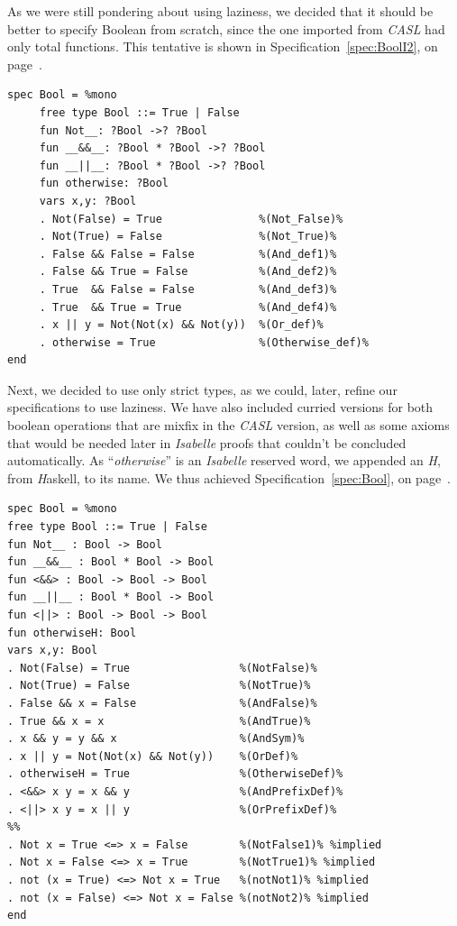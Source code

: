 \documentclass[12pt,twoside]{article}
\numberwithin{spec}{subsection}
\numberwithin{proof}{subsection}
\numberwithin{figure}{subsection}
\numberwithin{code}{subsection}
\newcommand{\citeSpec}[1]{Specification~\ref{#1}, on page~\pageref{#1}}
\begin{document}
As we were still pondering about using laziness, we decided that it should be better to specify Boolean from scratch, since the one imported from \textit{CASL} had only total functions. This tentative is shown in \citeSpec{spec:BoolI2}.

\begin{spec}
\begin{verbatim}
spec Bool = %mono
     free type Bool ::= True | False 
     fun Not__: ?Bool ->? ?Bool
     fun __&&__: ?Bool * ?Bool ->? ?Bool
     fun __||__: ?Bool * ?Bool ->? ?Bool
     fun otherwise: ?Bool      
     vars x,y: ?Bool
     . Not(False) = True               %(Not_False)%
     . Not(True) = False               %(Not_True)%
     . False && False = False          %(And_def1)%
     . False && True = False           %(And_def2)%
     . True  && False = False          %(And_def3)%
     . True  && True = True            %(And_def4)%
     . x || y = Not(Not(x) && Not(y))  %(Or_def)%
     . otherwise = True                %(Otherwise_def)%
end
\end{verbatim}
\caption{Initial Bool Specification from scratch}
\label{spec:Bool2}
\end{spec}

Next, we decided to use only strict types, as we could, later, refine our specifications to use laziness. We have also included curried versions for both boolean operations that are mixfix in the \textit{CASL} version, as well as some axioms that would be needed later in \textit{Isabelle} proofs that couldn't be concluded automatically. As ``\textit{otherwise}'' is an \textit{Isabelle} reserved word, we appended an \textit{H}, from \textit{H}askell, to its name. We thus achieved \citeSpec{spec:Bool}.

\begin{spec}\capstart
\begin{verbatim}
spec Bool = %mono
free type Bool ::= True | False 
fun Not__ : Bool -> Bool
fun __&&__ : Bool * Bool -> Bool
fun <&&> : Bool -> Bool -> Bool
fun __||__ : Bool * Bool -> Bool
fun <||> : Bool -> Bool -> Bool
fun otherwiseH: Bool      
vars x,y: Bool
. Not(False) = True                 %(NotFalse)%
. Not(True) = False                 %(NotTrue)%
. False && x = False                %(AndFalse)%
. True && x = x                     %(AndTrue)%
. x && y = y && x                   %(AndSym)%
. x || y = Not(Not(x) && Not(y))    %(OrDef)%
. otherwiseH = True                 %(OtherwiseDef)%
. <&&> x y = x && y                 %(AndPrefixDef)%
. <||> x y = x || y                 %(OrPrefixDef)%
%% 
. Not x = True <=> x = False        %(NotFalse1)% %implied
. Not x = False <=> x = True        %(NotTrue1)% %implied
. not (x = True) <=> Not x = True   %(notNot1)% %implied
. not (x = False) <=> Not x = False %(notNot2)% %implied
end
\end{verbatim}
\caption{Boolean Specification}
\label{spec:Bool}
\end{spec}
\end{document}
